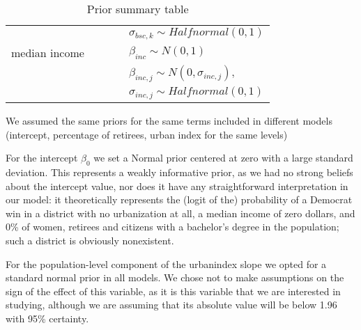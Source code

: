\documentclass[12pt]{article}
\begin{document}
\begin{table}[h]
{\begin{tabular}{l|llll}
			&                                          &                                          &                                              & $\sigma_{bsc,k} \sim Halfnormal(0,1)$        \\
			median income &                                          &                                          &                                              & $\beta_{inc} \sim N(0,1)$                    \\
			&                                          &                                          &                                              & $\beta_{inc, j} \sim N(0, \sigma_{inc,j}), $ \\
			&                                          &                                          &                                              & $\sigma_{inc,j} \sim Halfnormal(0,1)$        \\ 
			\bottomrule
		\end{tabular}%
	}
	\caption{Prior summary table}
	\label{tab:priors}
\end{table}




We assumed the same priors for the same terms included in different models (intercept, percentage of retirees, urban index for the same levels)




For the intercept $\beta_0$ we set a Normal prior centered at zero with a large standard deviation. 
This represents a weakly informative prior, as we had no strong beliefs about the intercept value, nor does it have any straightforward interpretation in our model: it theoretically represents the (logit of the) probability of a Democrat win in a district with no urbanization at all, a median income of zero dollars, and 0\% of women, retirees and citizens with a bachelor's degree in the population; such a district is obviously nonexistent.


For the population-level component of the urbanindex slope we opted for a standard normal prior in all models. We chose not to make assumptions on the sign of the effect of this variable, as it is this variable that we are interested in studying, although we are assuming that its absolute value will be below 1.96 with 95\% certainty. 
\end{document}
